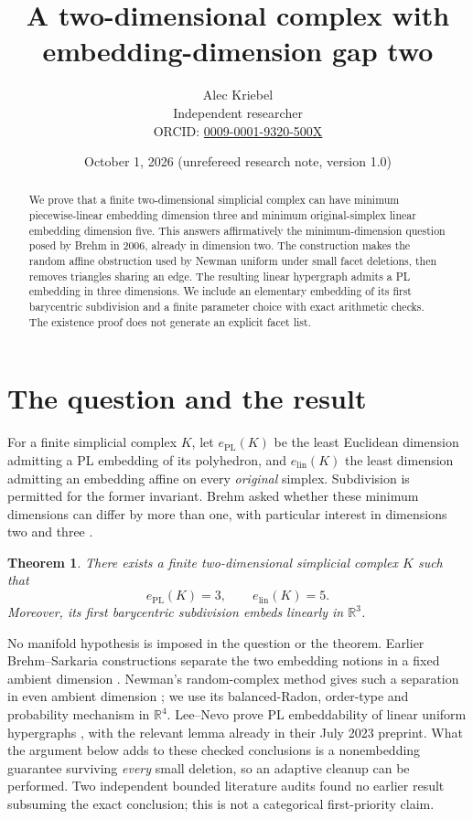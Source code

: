 \documentclass[11pt]{article}
\title{A two-dimensional complex with\\embedding-dimension gap two}
\author{Alec Kriebel\\
  \small Independent researcher\\
  \small ORCID: \href{https://orcid.org/0009-0001-9320-500X}{0009-0001-9320-500X}}
\date{October 1, 2026 \quad (unrefereed research note, version 1.0)}
\newtheorem{theorem}{Theorem}
\newcommand{\R}{\mathbb R}
\newcommand{\PL}{\mathrm{PL}}
\newcommand{\lin}{\mathrm{lin}}
\begin{document}
\maketitle
\begin{abstract}
We prove that a finite two-dimensional simplicial complex can have minimum
piecewise-linear embedding dimension three and minimum original-simplex
linear embedding dimension five. This answers affirmatively the
minimum-dimension question posed by Brehm in 2006, already in dimension two.
The construction makes the random affine obstruction used by Newman
uniform under small facet deletions, then removes triangles sharing an
edge. The resulting linear hypergraph admits a PL embedding in three
dimensions. We include an elementary embedding of its first barycentric
subdivision and a finite parameter choice with exact arithmetic checks.
The existence proof does not generate an explicit facet list.
\end{abstract}

\section{The question and the result}
For a finite simplicial complex $K$, let $e_{\PL}(K)$ be the least
Euclidean dimension admitting a PL embedding of its polyhedron, and
$e_{\lin}(K)$ the least dimension admitting an embedding affine on every
\emph{original} simplex. Subdivision is permitted for the former invariant.
Brehm asked whether these minimum dimensions can differ by more than
one, with particular interest in dimensions two and three
\cite[p.~702]{Brehm06}.

\begin{theorem}\label{thm:main}
There exists a finite two-dimensional simplicial complex $K$ such that
\[
e_{\PL}(K)=3,\qquad e_{\lin}(K)=5.
\]
Moreover, its first barycentric subdivision embeds linearly in $\R^3$.
\end{theorem}

No manifold hypothesis is imposed in the question or the theorem.
Earlier Brehm--Sarkaria constructions separate the two embedding notions
in a fixed ambient dimension \cite{BS92}. Newman's random-complex
method gives such a separation in even ambient dimension
\cite{Newman23}; we use its balanced-Radon, order-type and probability
mechanism in $\R^4$. Lee--Nevo prove PL embeddability of linear uniform
hypergraphs \cite[Lemma~3.1]{LN}, with the relevant lemma already in
their July 2023 preprint. What the argument below adds to these checked
conclusions is a nonembedding guarantee surviving \emph{every} small
deletion, so an adaptive cleanup can be performed. Two independent
bounded literature audits found no earlier result subsuming the exact
conclusion; this is not a categorical first-priority claim.
\end{document}
